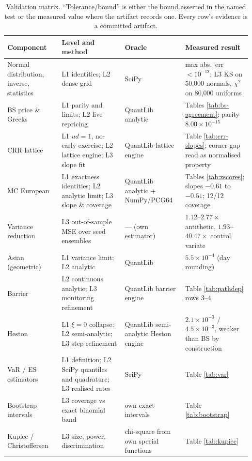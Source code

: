 \documentclass[11pt,a4paper]{article}
\begin{document}
\begin{table}[p]
\caption[Validation matrix]{Validation matrix. ``Tolerance/bound'' is either the bound asserted in the named test
or the measured value where the artifact records one. Every row's evidence is a committed
artifact.}
\label{tab:matrix}
\centering\footnotesize
\begin{tabular}{@{}>{\raggedright\arraybackslash}p{2.9cm}>{\raggedright\arraybackslash}p{4.0cm}>{\raggedright\arraybackslash}p{2.5cm}>{\raggedright\arraybackslash}p{3.4cm}@{}}
\toprule
Component & Level and method & Oracle & Measured result \\
\midrule
Normal distribution, inverse, statistics & L1 identities; L2 dense grid & SciPy \citep{scipy2020} & max abs.\ err $< 10^{-12}$; L3 KS on 50{,}000 normals, $\chi^2$ on 80{,}000 uniforms \\
BS price \& Greeks & L1 parity and limits; L2 live repricing & QuantLib analytic & Tables \ref{tab:bs-agreement}; parity $8.00\times10^{-15}$ \\
CRR lattice & L1 $ud=1$, no-early-exercise; L2 lattice engine; L3 slope fit & QuantLib lattice engine & Table \ref{tab:crr-slopes}; corner gap read as normalised property \\
MC European & L1 exactness identities; L2 analytic limit; L3 slope \& coverage & QuantLib analytic + NumPy/PCG64 & Tables \ref{tab:zscores}; slopes $-0.61$ to $-0.51$; 12/12 coverage \\
Variance reduction & L3 out-of-sample MSE over seed ensembles & --- (own estimator) & $1.12$--$2.77\times$ antithetic, $1.93$--$40.47\times$ control variate \\
Asian (geometric) & L1 variance limit; L2 analytic & QuantLib & $5.5\times10^{-4}$ (day rounding) \\
Barrier & L2 continuous analytic; L3 monitoring refinement & QuantLib barrier engine & Table \ref{tab:pathdep} rows 3--4 \\
Heston & L1 $\xi=0$ collapse; L2 semi-analytic; L3 step refinement & QuantLib semi-analytic Heston engine & $2.1\times10^{-3}$ / $4.5\times10^{-3}$, weaker than BS by construction \\
VaR / ES estimators & L1 definition; L2 SciPy quantiles and quadrature; L3 realised rates & SciPy & Table \ref{tab:var} \\
Bootstrap intervals & L3 coverage vs exact binomial band & own exact intervals & Table \ref{tab:bootstrap} \\
Kupiec / Christoffersen & L3 size, power, discrimination & chi-square from own special functions & Table \ref{tab:kupiec} \\

\end{tabular}
\end{table}
\end{document}
